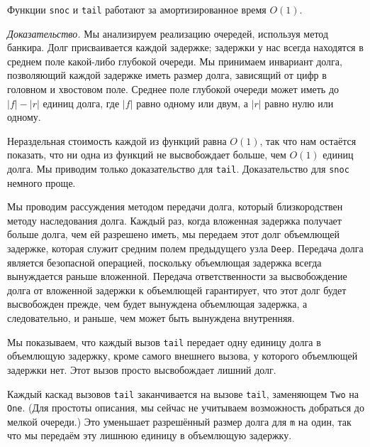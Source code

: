 \begin{theorem}\label{th:11.1}
  Функции \lstinline!snoc! и \lstinline!tail! работают за
  амортизированное время $O(1)$.

  \noindent
  \emph{Доказательство.} Мы анализируем реализацию очередей, используя
  метод банкира. Долг присваивается каждой задержке; задержки у нас
  всегда находятся в среднем поле какой-либо глубокой очереди.  Мы
  принимаем инвариант долга, позволяющий каждой задержке иметь размер
  долга, зависящий от цифр в головном и хвостовом поле. Среднее поле
  глубокой очереди может иметь до $|f| - |r|$ единиц долга, где $|f|$
  равно одному или двум, а $|r|$ равно нулю или одному.

  Нераздельная стоимость каждой из функций равна $O(1)$, так что нам
  остаётся показать, что ни одна из функций не высвобождает больше,
  чем $O(1)$ единиц долга. Мы приводим только доказательство для
  \lstinline!tail!. Доказательство для \lstinline!snoc! немного проще.

  Мы проводим рассуждения методом передачи долга, который
  близкородствен методу наследования долга.  Каждый раз, когда
  вложенная задержка получает больше долга, чем ей разрешено иметь, мы
  передаем этот долг объемлющей задержке, которая служит средним полем
  предыдущего узла \lstinline!Deep!. Передача долга является
  безопасной операцией, поскольку объемлющая задержка всегда
  вынуждается раньше вложенной.  Передача ответственности за
  высвобождение долга от вложенной задержки к объемлющей гарантирует,
  что этот долг будет высвобожден прежде, чем будет вынуждена
  объемлющая задержка, а следовательно, и раньше, чем может быть вынуждена
  внутренняя. 

  Мы показываем, что каждый вызов \lstinline!tail! передает одну
  единицу долга в объемлющую задержку, кроме самого внешнего вызова, у
  которого объемлющей задержки нет. Этот вызов просто высвобождает
  лишний долг.

  Каждый каскад вызовов \lstinline!tail! заканчивается на вызове
  \lstinline!tail!, заменяющем \lstinline!Two! на
  \lstinline!One!. (Для простоты описания, мы сейчас не учитываем
  возможность добраться до мелкой очереди.) Это уменьшает разрешённый
  размер долга для \lstinline!m! на один, так что мы передаём эту
  лишнюю единицу в объемлющую задержку.


\end{theorem}
